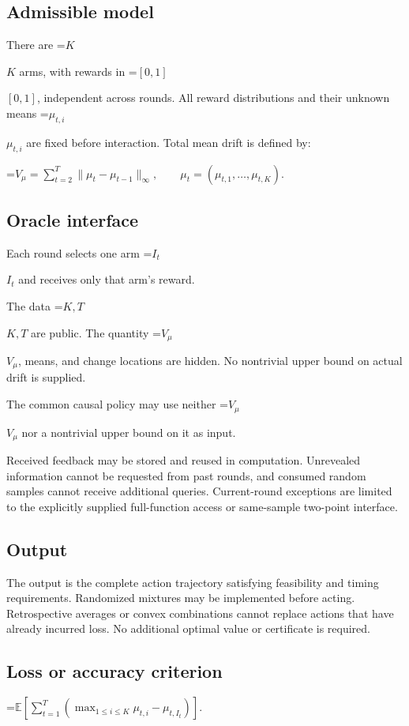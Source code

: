 \documentclass[10pt,a4paper]{article}
\newcommand{\AtlasMath}[1]{\par\begingroup\centering\setbox0=\hbox{$\displaystyle #1$}\ifdim\wd0>1.4\linewidth\typeout{ATLAS WIDE FORMULA: \the\wd0}\fi\ifdim\wd0>\linewidth\resizebox{\linewidth}{!}{\box0}\else\box0\fi\par\endgroup}
\newcommand{\AtlasInlineMath}[1]{\begingroup\setbox0=\hbox{$#1$}\ifdim\wd0>.4\linewidth\endgroup\AtlasMath{#1}\else\endgroup$#1$\fi}
\begin{document}
\subsection{Admissible model}
There are \AtlasInlineMath{K} arms, with rewards in \AtlasInlineMath{[0,1]}, independent across rounds. All reward distributions and their unknown means \AtlasInlineMath{\mu_{t,i}} are fixed before interaction. Total mean drift is defined by:


\AtlasMath{V_\mu=\sum_{t=2}^{T}\|\mu_t-\mu_{t-1}\|_\infty,\qquad \mu_t=(\mu_{t,1},\ldots,\mu_{t,K}).}


\subsection{Oracle interface}
Each round selects one arm \AtlasInlineMath{I_t} and receives only that arm's reward.

The data \AtlasInlineMath{K,T} are public. The quantity \AtlasInlineMath{V_\mu}, means, and change locations are hidden. No nontrivial upper bound on actual drift is supplied.

The common causal policy may use neither \AtlasInlineMath{V_\mu} nor a nontrivial upper bound on it as input.

Received feedback may be stored and reused in computation. Unrevealed information cannot be requested from past rounds, and consumed random samples cannot receive additional queries. Current-round exceptions are limited to the explicitly supplied full-function access or same-sample two-point interface.

\subsection{Output}
The output is the complete action trajectory satisfying feasibility and timing requirements. Randomized mixtures may be implemented before acting. Retrospective averages or convex combinations cannot replace actions that have already incurred loss. No additional optimal value or certificate is required.

\subsection{Loss or accuracy criterion}

\AtlasMath{\mathbb{E}\!\left[\sum_{t=1}^{T}\left(\max_{1\le i\le K}\mu_{t,i}-\mu_{t,I_t}\right)\right].}
\end{document}
